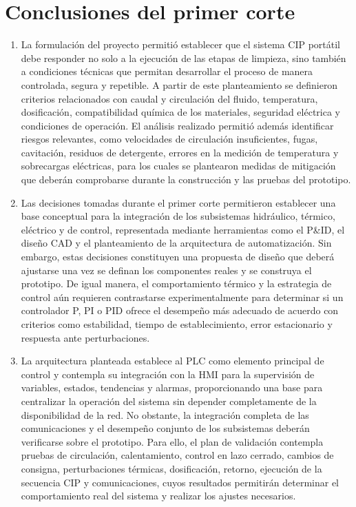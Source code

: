 \section{Conclusiones del primer corte}

\begin{enumerate}

\item La formulación del proyecto permitió establecer que el sistema CIP portátil debe responder no solo a la ejecución de las etapas de limpieza, sino también a condiciones técnicas que permitan desarrollar el proceso de manera controlada, segura y repetible. A partir de este planteamiento se definieron criterios relacionados con caudal y circulación del fluido, temperatura, dosificación, compatibilidad química de los materiales, seguridad eléctrica y condiciones de operación. El análisis realizado permitió además identificar riesgos relevantes, como velocidades de circulación insuficientes, fugas, cavitación, residuos de detergente, errores en la medición de temperatura y sobrecargas eléctricas, para los cuales se plantearon medidas de mitigación que deberán comprobarse durante la construcción y las pruebas del prototipo.

\item Las decisiones tomadas durante el primer corte permitieron establecer una base conceptual para la integración de los subsistemas hidráulico, térmico, eléctrico y de control, representada mediante herramientas como el P\&ID, el diseño CAD y el planteamiento de la arquitectura de automatización. Sin embargo, estas decisiones constituyen una propuesta de diseño que deberá ajustarse una vez se definan los componentes reales y se construya el prototipo. De igual manera, el comportamiento térmico y la estrategia de control aún requieren contrastarse experimentalmente para determinar si un controlador P, PI o PID ofrece el desempeño más adecuado de acuerdo con criterios como estabilidad, tiempo de establecimiento, error estacionario y respuesta ante perturbaciones.

\item La arquitectura planteada establece al PLC como elemento principal de control y contempla su integración con la HMI para la supervisión de variables, estados, tendencias y alarmas, proporcionando una base para centralizar la operación del sistema sin depender completamente de la disponibilidad de la red. No obstante, la integración completa de las comunicaciones y el desempeño conjunto de los subsistemas deberán verificarse sobre el prototipo. Para ello, el plan de validación contempla pruebas de circulación, calentamiento, control en lazo cerrado, cambios de consigna, perturbaciones térmicas, dosificación, retorno, ejecución de la secuencia CIP y comunicaciones, cuyos resultados permitirán determinar el comportamiento real del sistema y realizar los ajustes necesarios.

\end{enumerate}

